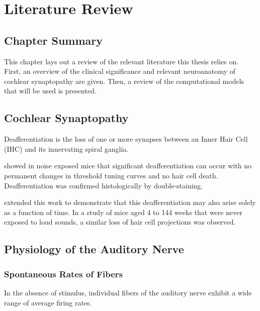 \chapter{Literature Review}
\label{chapter:literaturereview}
\thispagestyle{myheadings}
\graphicspath{{2_LiteratureReview/Figures/}}
\section{Chapter Summary} %
\label{sec:review_summary}
This chapter lays out a review of the relevant literature this thesis relies on. First, an overview of the clinical significance and relevant neuroanatomy of cochlear synaptopathy are given.  Then, a review of the computational models that will be used is presented. 

\section{Cochlear Synaptopathy} %
\label{sec:cochlear_synaptopathy}
Deafferentiation is the loss of one or more synapses between an Inner Hair Cell (IHC) and its innervating spiral ganglia. 

\cite{Kujawa2009Adding} showed in noise exposed mice that significant deafferentiation can occur with no permanent changes in threshold tuning curves and no hair cell death. Deafferentiation was confirmed histologically by double-staining.

\cite{Sergeyenko2013AgeRelated} extended this work to demonstrate that this deafferentiation may also arise solely as a function of time.  In a study of mice aged 4 to 144 weeks that were never exposed to loud sounds, a similar loss of hair cell projections was observed. 


\section{Physiology of the Auditory Nerve} %
\label{sec:physiology_of_the_auditory_nerve}
\subsection{Spontaneous Rates of Fibers} %
\label{sub:spontaneous_rates_of_fibers}
In the absence of stimulus, individual fibers of the auditory nerve exhibit a wide range of average firing rates.  
